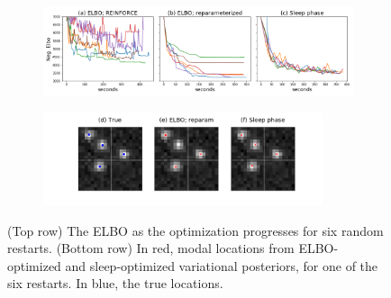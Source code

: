 \begin{figure}[!htb]
    \centering
    \begin{subfigure}[t]{0.9\textwidth}
    \centering
    \includegraphics[width=\textwidth]{figures/elbo_vs_sleep/optim_path_compare.png}
    \end{subfigure}
    \begin{subfigure}[t]{\textwidth}
    \centering
    \includegraphics[width=0.9\textwidth]{figures/elbo_vs_sleep/optim_path_detect_compare.png}
    \end{subfigure}
    \vspace{-1.5cm}
    \caption{(Top row) The ELBO as the optimization progresses for six random restarts. 
    (Bottom row) In red, modal locations from ELBO-optimized and sleep-optimized variational posteriors, for one of the six restarts.
    In blue, the true locations. }
    \label{fig:optim_path}
\end{figure}


